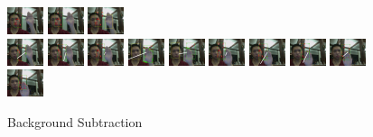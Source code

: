 \documentclass[12pt]{article}
\begin{document}
\begin{figure}[H]
\includegraphics[width=40px, height=30px]{../data/nobg/img0037.jpg}
\includegraphics[width=40px, height=30px]{../data/nobg/img0038.jpg}
\includegraphics[width=40px, height=30px]{../data/nobg/img0039.jpg} \\
\includegraphics[width=40px, height=30px]{../data/nobg/img0040.jpg}
\includegraphics[width=40px, height=30px]{../data/nobg/img0041.jpg}
\includegraphics[width=40px, height=30px]{../data/nobg/img0042.jpg}
\includegraphics[width=40px, height=30px]{../data/nobg/img0043.jpg}
\includegraphics[width=40px, height=30px]{../data/nobg/img0044.jpg}
\includegraphics[width=40px, height=30px]{../data/nobg/img0045.jpg}
\includegraphics[width=40px, height=30px]{../data/nobg/img0046.jpg}
\includegraphics[width=40px, height=30px]{../data/nobg/img0047.jpg}
\includegraphics[width=40px, height=30px]{../data/nobg/img0048.jpg}
\includegraphics[width=40px, height=30px]{../data/nobg/img0049.jpg}
\label{seq-nobg}
\caption{Background Subtraction}
\end{figure}
\end{document}

